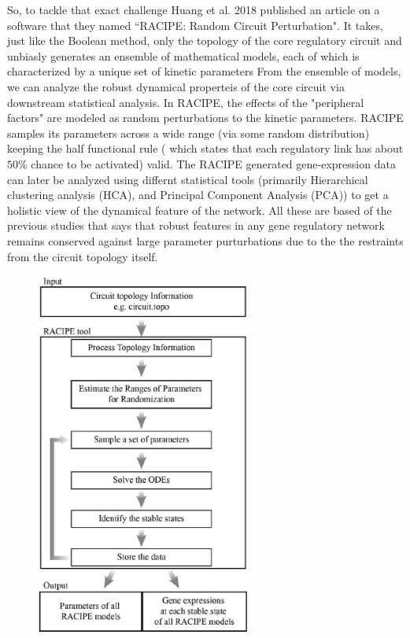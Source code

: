 \documentclass{article}
\begin{document}
So, to tackle that exact challenge Huang et al. 2018 \cite{RACIPE} published 
an article on a software that they named ``RACIPE: Random Circuit Perturbation".
It takes, just like the Boolean method, only the topology of the core regulatory
circuit and unbiasly generates an ensemble of mathematical models, each of which 
is characterized by a unique set of kinetic parameters From the ensemble of 
models, we can analyze the robust dynamical properteis of the core circuit via 
downstream statistical analysis. In RACIPE, the effects of the "peripheral 
factors" are modeled as random perturbations to the kinetic parameters. RACIPE
samples its parameters across a wide range (via some random distribution) 
keeping the half functional rule (
which states that each regulatory link has about $50\%$ chance to be activated)
valid. The RACIPE generated gene-expression data can later be analyzed using 
differnt statistical tools (primarily Hierarchical clustering analysis (HCA), 
and Principal Component Analysis (PCA)) to get a holistic view of the dynamical 
feature of the network. All these are based of the previous studies that says 
that robust features in any gene regulatory network remains conserved against
large parameter purturbations due to the the restraints from the circuit 
topology itself. 

\begin{figure}[H]
  \centering
  \includegraphics[width=70mm, scale=0.5]{racipe_workflow.png} \\
\end{figure}
\end{document}
